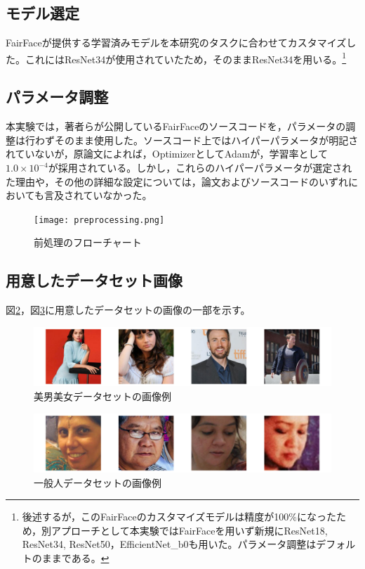 \documentclass[a4paper,11pt,titlepage]{jsarticle}
\begin{document}
\subsection{モデル選定}
FairFaceが提供する学習済みモデルを本研究のタスクに合わせてカスタマイズした。これにはResNet34が使用されていたため，そのままResNet34を用いる。\footnote{後述するが，このFairFaceのカスタマイズモデルは精度が100\%になったため，別アプローチとして本実験ではFairFaceを用いず新規にResNet18, ResNet34, ResNet50，EfficientNet\_b0も用いた。パラメータ調整はデフォルトのままである。}


\subsection{パラメータ調整}
本実験では，著者らが公開しているFairFaceのソースコード\cite{FairFaceGitHub}を，パラメータの調整は行わずそのまま使用した。ソースコード上ではハイパーパラメータが明記されていないが，原論文\cite{karkkainenFairFace}によれば，OptimizerとしてAdamが，学習率として$1.0 \times 10^{-4}$が採用されている。しかし，これらのハイパーパラメータが選定された理由や，その他の詳細な設定については，論文\cite{karkkainenFairFace}およびソースコード\cite{FairFaceGitHub}のいずれにおいても言及されていなかった。


\begin{figure}[htbp]
    \centering
    \texttt{[image: preprocessing.png]}
    \caption{前処理のフローチャート}
    \label{fig:prepro}
\end{figure}


\subsection{用意したデータセット画像}
図\ref{fig:good_ex}，図\ref{fig:normal_ex}に用意したデータセットの画像の一部を示す。
\begin{figure}[H]
    \centering
    \includegraphics[width=1.1\textwidth]{ex_good_dataset.png}
    \caption{美男美女データセットの画像例}
    \label{fig:good_ex}
\end{figure}
\begin{figure}[H]
    \centering
    \includegraphics[width=1.1\textwidth]{ex_normal_dataset.png}
    \caption{一般人データセットの画像例}
    \label{fig:normal_ex}
\end{figure}
\end{document}
